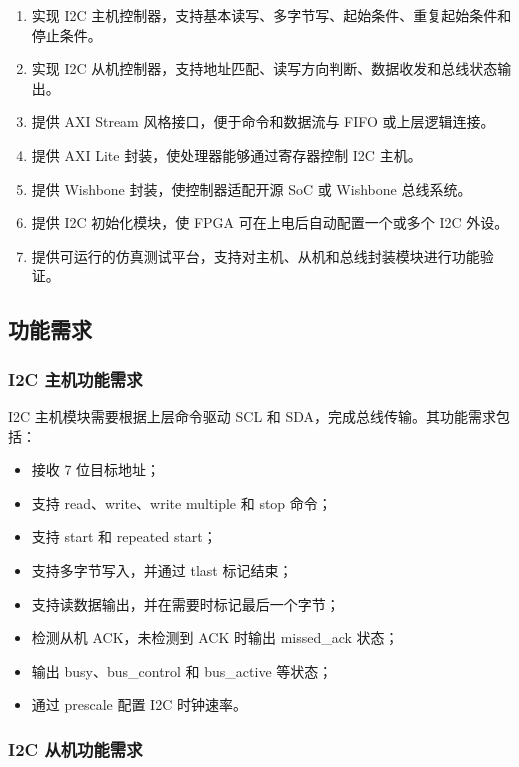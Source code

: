 \documentclass[12pt,a4paper]{article}
\numberwithin{equation}{section}
\providecommand{\tightlist}{%
  \setlength{\itemsep}{0pt}\setlength{\parskip}{0pt}}
\begin{document}
\begin{enumerate}
\def\labelenumi{\arabic{enumi}.}
\tightlist
\item
  实现 I2C
  主机控制器，支持基本读写、多字节写、起始条件、重复起始条件和停止条件。
\item
  实现 I2C
  从机控制器，支持地址匹配、读写方向判断、数据收发和总线状态输出。
\item
  提供 AXI Stream 风格接口，便于命令和数据流与 FIFO 或上层逻辑连接。
\item
  提供 AXI Lite 封装，使处理器能够通过寄存器控制 I2C 主机。
\item
  提供 Wishbone 封装，使控制器适配开源 SoC 或 Wishbone 总线系统。
\item
  提供 I2C 初始化模块，使 FPGA 可在上电后自动配置一个或多个 I2C 外设。
\item
  提供可运行的仿真测试平台，支持对主机、从机和总线封装模块进行功能验证。
\end{enumerate}

\subsection{功能需求}\label{ux529fux80fdux9700ux6c42}

\subsubsection{I2C
主机功能需求}\label{i2c-ux4e3bux673aux529fux80fdux9700ux6c42}

I2C 主机模块需要根据上层命令驱动 SCL 和
SDA，完成总线传输。其功能需求包括：

\begin{itemize}
\tightlist
\item
  接收 7 位目标地址；
\item
  支持 read、write、write multiple 和 stop 命令；
\item
  支持 start 和 repeated start；
\item
  支持多字节写入，并通过 tlast 标记结束；
\item
  支持读数据输出，并在需要时标记最后一个字节；
\item
  检测从机 ACK，未检测到 ACK 时输出
  missed\_ack 状态；
\item
  输出
  busy、bus\_control
  和 bus\_active 等状态；
\item
  通过 prescale 配置 I2C 时钟速率。
\end{itemize}

\subsubsection{I2C
从机功能需求}\label{i2c-ux4eceux673aux529fux80fdux9700ux6c42}
\end{document}
